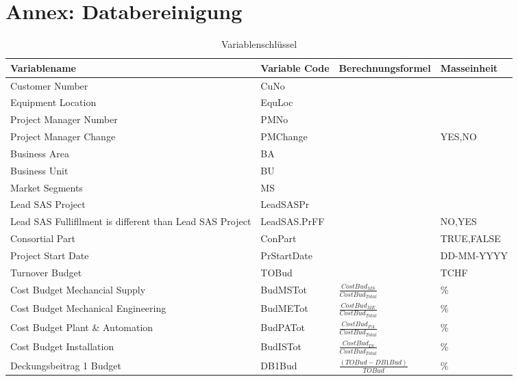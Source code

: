 \documentclass[11pt]{article}
\begin{document}
\section*{Annex: Databereinigung}
\newpage\begin{landscape}
\begin{center}
\begin{longtable}{p{6cm}|p{4cm}|p{6cm}|p{3cm}}
	\caption{Variablenschlüssel}\\\hline
	\textbf{Variablename} & \textbf{Variable Code} & {\textbf{Berechnungsformel}} & {\textbf{Masseinheit}} \\\hline\endhead
		Customer Number & CuNo  &       &  \\
		Equipment Location & EquLoc &       &  \\
		Project Manager Number & PMNo  &       &  \\
		Project Manager Change & PMChange &       & \multicolumn{1}{l}{{YES,NO}} \\
		Business Area & BA    &       &  \\
		Business Unit & BU    &       &  \\
		Market Segments & MS    &       &  \\
		Lead SAS Project & LeadSASPr &       &  \\
		Lead SAS Fullifllment is different than Lead SAS Project & LeadSAS.PrFF &       & \multicolumn{1}{l}{{NO,YES}} \\
		Consortial Part & ConPart &       & \multicolumn{1}{l}{{TRUE,FALSE}} \\
		Project Start Date & PrStartDate &       & \multicolumn{1}{l}{DD-MM-YYYY} \\
		Turnover Budget & TOBud &       & \multicolumn{1}{l}{TCHF} \\
		Cost Budget Mechancial Supply & BudMSTot & $\frac{Cost Bud_{MS}}{Cost Bud_{Total}}$ & \multicolumn{1}{l}{\%} \\ [3mm]
		Cost Budget Mechanical Engineering & BudMETot & $\frac{Cost Bud_{ME}}{Cost Bud_{Total}}$ & \multicolumn{1}{l}{\%} \\ [3mm]
		Cost Budget Plant \& Automation & BudPATot & $\frac{Cost Bud_{PA}}{Cost Bud_{Total}}$ & \multicolumn{1}{l}{\%} \\ [3mm]
		Cost Budget Installation  & BudISTot & $\frac{Cost Bud_{IS}}{Cost Bud_{Total}}$ & \multicolumn{1}{l}{\%} \\ [3mm]
		Deckungsbeitrag 1 Budget & DB1Bud &  $\frac{(TOBud - DB1Bud)}{TOBud}$ & \multicolumn{1}{l}{\%} \\ [3mm]

\end{longtable}
\end{center}
\end{landscape}
\end{document}
